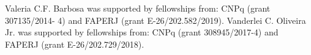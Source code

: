 \documentclass[journal abbreviation, manuscript]{copernicus}
\begin{document}
\authorcontribution{} %



\begin{acknowledgements}
Valeria C.F. Barbosa was supported by fellowships from: CNPq (grant 307135/2014- 4) and FAPERJ (grant E-26/202.582/2019). 
Vanderlei C. Oliveira Jr. was supported by fellowships from: CNPq (grant 308945/2017-4) and FAPERJ (grant E-26/202.729/2018). 
\end{acknowledgements}



\end{document}

